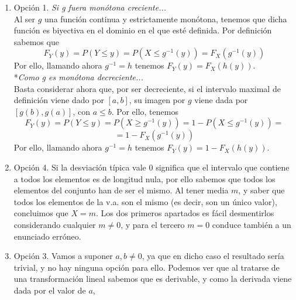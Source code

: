 \documentclass[fleqn]{article}
\begin{document}
\begin{enumerate}
                        \begin{enumerate}
                                \item Opción 1. \textit{Si g fuera monótona creciente...}\\
                                        Al ser $g$ una función continua y estrictamente monótona, tenemos que dicha función es biyectiva en el dominio
                                        en el que esté definida. Por definición sabemos que 
                                        $$F_Y(y) = P(Y \leq y) = P(X\leq g^{-1}(y)) = F_X (g^{-1}(y))$$
                                        Por ello, llamando ahora $g^{-1}=h$ tenemos $F_Y(y) = F_X (h(y))$.\\ 
                                        *\textit{Como g es monótona decreciente...}\\
                                        Basta considerar ahora que, por ser decreciente, si el intervalo maximal de definición viene dado por $[a, b]$, su imagen 
                                        por $g$ viene dada por $[g(b), g(a)]$, con $a\leq b$. Por ello, tenemos
                                        $$F_Y(y) = P(Y \leq y) = P(X\geq g^{-1}(y)) = 1 - P(X\leq g^{-1}(y)) =$$
                                        $$= 1 - F_X (g^{-1}(y))$$
                                        Por ello, llamando ahora $g^{-1}=h$ tenemos $F_Y(y) = 1 - F_X (h(y))$.\\
                                \item Opción 4. Si la desviación típica vale 0 significa que el intervalo que contiene a todos los elementos es de longitud nula, 
                                        por ello sabemos que todos los elementos del conjunto han de ser el mismo. Al tener media $m$, y saber que todos
                                        los elementos de la v.a. son el mismo (es decir, son un único valor), concluimos que $X=m$. Los dos primeros 
                                        apartados es fácil desmentirlos considerando cualquier $m \neq 0$, y para el tercero $m=0$ conduce también a
                                        un enunciado erróneo. \\
                                \item Opción 3. Vamos a suponer $a,b \neq 0$, ya que en dicho caso el resultado sería trivial, y no hay ninguna opción para ello. Podemos
                                        ver que al tratarse de una transformación lineal sabemos que es derivable, y como la derivada viene dada por el valor de $a$,

\end{enumerate}
\end{enumerate}
\end{document}
